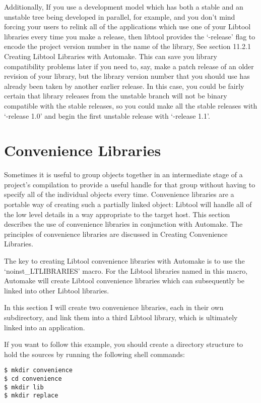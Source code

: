 Additionally, If you use a development model which has both a stable and an unstable tree being developed in parallel, for example, and you don't mind forcing your users to relink all of the applications which use one of your Libtool libraries every time you make a release, then libtool provides the `-release' flag to encode the project version number in the name of the library, See section 11.2.1 Creating Libtool Libraries with Automake. This can save you library compatibility problems later if you need to, say, make a patch release of an older revision of your library, but the library version number that you should use has already been taken by another earlier release. In this case, you could be fairly certain that library releases from the unstable branch will not be binary compatible with the stable releases, so you could make all the stable releases with `-release 1.0' and begin the first unstable release with `-release 1.1'. 

\section{Convenience Libraries}


Sometimes it is useful to group objects together in an intermediate stage of a project's compilation to provide a useful handle for that group without having to specify all of the individual objects every time. Convenience libraries are a portable way of creating such a partially linked object: Libtool will handle all of the low level details in a way appropriate to the target host. This section describes the use of convenience libraries in conjunction with Automake. The principles of convenience libraries are discussed in Creating Convenience Libraries. 


The key to creating Libtool convenience libraries with Automake is to use the
`noinst\_{}LTLIBRARIES' macro. For the Libtool libraries named in this macro, Automake will create Libtool convenience libraries which can subsequently be linked into other Libtool libraries. 


In this section I will create two convenience libraries, each in their own subdirectory, and link them into a third Libtool library, which is ultimately linked into an application. 


If you want to follow this example, you should create a directory structure to hold the sources by running the following shell commands:

\begin{verbatim}
$ mkdir convenience
$ cd convenience
$ mkdir lib
$ mkdir replace
\end{verbatim}



